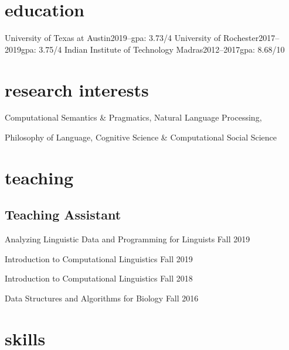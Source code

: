 \documentclass[10pt,a4paper]{mycv}
\begin{document}
\cfoot{\sansc \thepage}
\makecvtitle


\section{education}
    {University of Texas at Austin}{2019--}{\rmsc gpa: 3.73/4}{}
    {University of Rochester}{2017--2019}{\rmsc gpa: 3.75/4}{}
    {Indian Institute of Technology Madras}{2012--2017}{\rmsc gpa: 8.68/10}{}

\section{research interests}

{\large Computational Semantics \& Pragmatics, Natural Language Processing,

\vspace{0.5ex}

Philosophy of Language, Cognitive Science \& Computational Social Science}


\begingroup
\setlength\bibitemsep{2ex}
\printbibliography[title={\sansc papers}, nottype=unpublished]
\endgroup

\begingroup
\setlength\bibitemsep{2ex}
\printbibliography[title={\sansc talks}, type=unpublished]
\endgroup


\section{teaching}

\subsection{Teaching Assistant}

Analyzing Linguistic Data and Programming for Linguists \hfill Fall 2019

Introduction to Computational Linguistics \hfill Fall 2019

Introduction to Computational Linguistics \hfill Fall 2018

Data Structures and Algorithms for Biology \hfill Fall 2016

\section{skills}
\end{document}
